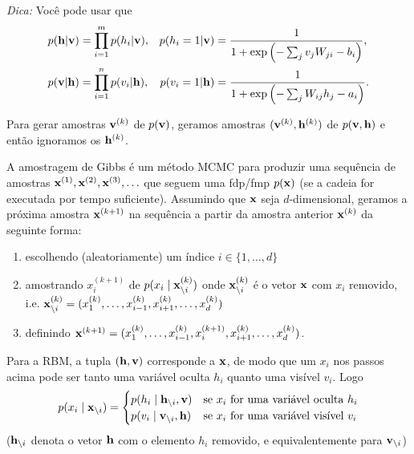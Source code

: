 \emph{Dica:} Voc\^e pode usar que
\begin{align}
    p(\mathbf{h} | \mathbf{v}) &= \prod_{i=1}^m p(h_i | \mathbf{v}), &  p(h_i=1 | \mathbf{v}) & =  \frac{1}{ 1+  \exp\left(- \sum_j v_j W_{ji} - b_i \right)}, \\
    p(\mathbf{v} | \mathbf{h}) &= \prod_{i=1}^n p(v_i | \mathbf{h}), &  p(v_i = 1 | \mathbf{h}) &= \frac{1}{1+\exp\left(-\sum_j W_{ij} h_j-a_i\right)}.
\end{align}


\begin{solution}
    Para gerar amostras $\mathbf{v}^{(k)}$ de $p(\mathbf{v})$, geramos
    amostras $(\mathbf{v}^{(k)}, \mathbf{h}^{(k)})$ de $p(\mathbf{v}, \mathbf{h})$ e ent\~ao ignoramos os
    $\mathbf{h}^{(k)}$.
    
    A amostragem de Gibbs \'e um m\'etodo MCMC para produzir uma sequ\^encia de amostras
    $\mathbf{x}^{(1)}, \mathbf{x}^{(2)}, \mathbf{x}^{(3)}, \ldots$ que seguem uma fdp/fmp $p(\mathbf{x})$
    (se a cadeia for executada por tempo suficiente). Assumindo que $\mathbf{x}$ seja
    $d$-dimensional, geramos a pr\'oxima amostra $\mathbf{x}^{(k+1)}$ na
    sequ\^encia a partir da amostra anterior $\mathbf{x}^{(k)}$ da seguinte forma:
    \begin{enumerate}
        \item escolhendo (aleatoriamente) um \'indice $i \in \{1, \ldots, d \}$
        \item amostrando $x_i^{(k+1)}$ de $p(x_i \mid \mathbf{x}^{(k)}_{\backslash
            i})$ onde $\mathbf{x}^{(k)}_{\backslash i}$ \'e o vetor $\mathbf{x}$ com $x_i$
        removido, i.e. $\mathbf{x}^{(k)}_{\backslash i}
        =({x}_1^{(k)},\ldots,{x}_{i-1}^{(k)},{x}_{i+1}^{(k)},\ldots,{x}_d^{(k)})$
        \item definindo $\mathbf{x}^{(k+1)} =({x}_1^{(k)},\ldots,{x}_{i-1}^{(k)},x_i^{(k+1)},{x}_{i+1}^{(k)},\ldots,{x}_d^{(k)})$.
    \end{enumerate}
    Para a RBM, a tupla $(\mathbf{h},\mathbf{v})$ corresponde a $\mathbf{x}$, de modo que um $x_i$
    nos passos acima pode ser tanto uma vari\'avel oculta $h_i$ quanto uma vis\'ivel $v_i$. Logo
    \begin{equation}
        p(x_i \mid \mathbf{x}_{\backslash i}) = \begin{cases}
            p(h_i \mid \mathbf{h}_{\backslash i}, \mathbf{v}) & \text{se $x_i$ for uma vari\'avel oculta $h_i$}\\
            p(v_i \mid \mathbf{v}_{\backslash i}, \mathbf{h}) & \text{se $x_i$ for uma vari\'avel vis\'ivel $v_i$}
        \end{cases}
    \end{equation}
    ($\mathbf{h}_{\backslash i}$ denota o vetor $\mathbf{h}$ com o elemento $h_i$
    removido, e equivalentemente para $\mathbf{v}_{\backslash i}$)
    

\end{solution}
